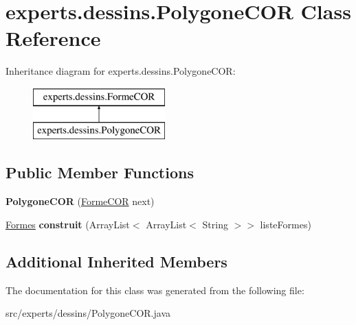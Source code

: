\hypertarget{classexperts_1_1dessins_1_1_polygone_c_o_r}{}\section{experts.\+dessins.\+Polygone\+C\+OR Class Reference}
\label{classexperts_1_1dessins_1_1_polygone_c_o_r}
Inheritance diagram for experts.\+dessins.\+Polygone\+C\+OR\+:\begin{figure}[H]
\begin{center}
\leavevmode
\includegraphics[height=2.000000cm]{d8/d88/classexperts_1_1dessins_1_1_polygone_c_o_r}
\end{center}
\end{figure}
\subsection*{Public Member Functions}
\begin{DoxyCompactItemize}
\item 
\mbox{\label{classexperts_1_1dessins_1_1_polygone_c_o_r_ac297f129d9172592e814917597592167}} 
{\bfseries Polygone\+C\+OR} (\mbox{\hyperlink{classexperts_1_1dessins_1_1_forme_c_o_r}{Forme\+C\+OR}} next)
\item 
\mbox{\label{classexperts_1_1dessins_1_1_polygone_c_o_r_a53acfc15656155dd4cdde1a68b6312bf}} 
\mbox{\hyperlink{classdessin_1_1_formes}{Formes}} {\bfseries construit} (Array\+List$<$ Array\+List$<$ String $>$$>$ liste\+Formes)
\end{DoxyCompactItemize}
\subsection*{Additional Inherited Members}


The documentation for this class was generated from the following file\+:\begin{DoxyCompactItemize}
\item 
src/experts/dessins/Polygone\+C\+O\+R.\+java\end{DoxyCompactItemize}
